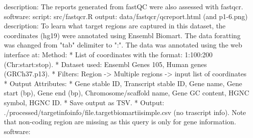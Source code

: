 {}\markdownRendererInterblockSeparator
{}\markdownRendererUlBeginTight
\markdownRendererUlItem description: The reports generated from fastQC were also assessed with fastqcr.\markdownRendererUlItemEnd 
\markdownRendererUlItem software: \markdownRendererUlItemEnd 
\markdownRendererUlItem script: src/fastqcr.R\markdownRendererUlItemEnd 
\markdownRendererUlItem output: data/fastqcr/qc\markdownRendererUnderscore{}report.html (and p1-6.png)\markdownRendererUlItemEnd 
\markdownRendererUlEndTight \markdownRendererInterblockSeparator
{}\markdownRendererInterblockSeparator
{}\markdownRendererUlBeginTight
\markdownRendererUlItem description: To learn what target regions are captured in this dataset, the coordinates (hg19) were annotated using Ensembl Biomart. The data foratting was changed from "tab" delimiter to ":". The data was annotated using the web interface at: \markdownRendererUlItemEnd 
\markdownRendererUlEndTight \markdownRendererInterblockSeparator
{}Method: * List of coordinates with the format: 1:100:200 (Chr:start:stop). * Dataset used: Ensembl Genes 105, Human genes (GRCh37.p13). * Filters: Region -> Multiple regions -> input list of coordinates * Output Attributes: * Gene stable ID, Transcript stable ID, Gene name, Gene start (bp), Gene end (bp), Chromosome/scaffold name, Gene \markdownRendererPercentSign{} GC content, HGNC symbol, HGNC ID. * Save output as TSV. * Output: ./processed/targetinfoinfo/file.targetbiomartii\markdownRendererUnderscore{}simple.csv (no trascript info). Note that non-coding region are missing as this query is only for gene information.\markdownRendererInterblockSeparator
{}\markdownRendererUlBeginTight
\markdownRendererUlItem software: \markdownRendererUlItemEnd 
